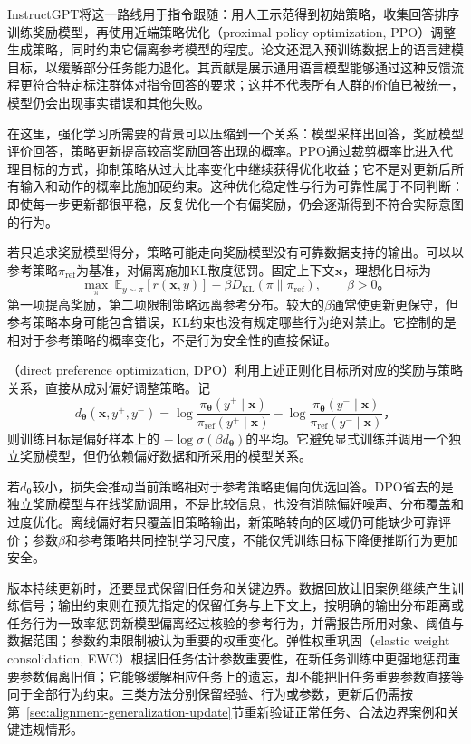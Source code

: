 InstructGPT将这一路线用于指令跟随：用人工示范得到初始策略，收集回答排序训练奖励模型，再使用近端策略优化（proximal policy optimization, PPO）调整生成策略，同时约束它偏离参考模型的程度。论文还混入预训练数据上的语言建模目标，以缓解部分任务能力退化。其贡献是展示通用语言模型能够通过这种反馈流程更符合特定标注群体对指令回答的要求；这并不代表所有人群的价值已被统一，模型仍会出现事实错误和其他失败。

在这里，强化学习所需要的背景可以压缩到一个关系：模型采样出回答，奖励模型评价回答，策略更新提高较高奖励回答出现的概率。PPO通过裁剪概率比进入代理目标的方式，抑制策略从过大比率变化中继续获得优化收益；它不是对更新后所有输入和动作的概率比施加硬约束。这种优化稳定性与行为可靠性属于不同判断：即使每一步更新都很平稳，反复优化一个有偏奖励，仍会逐渐得到不符合实际意图的行为。

若只追求奖励模型得分，策略可能走向奖励模型没有可靠数据支持的输出。可以以参考策略$\pi_{\mathrm{ref}}$为基准，对偏离施加KL散度惩罚。固定上下文$\bm{x}$，理想化目标为
\begin{equation}
 \max_\pi\
 \mathbb E_{y\sim\pi}[r(\bm{x},y)]
 -\beta D_{\mathrm{KL}}(\pi\|\pi_{\mathrm{ref}}),
 \qquad \beta>0\text{。}
 \label{eq:alignment-kl-objective}
\end{equation}
第一项提高奖励，第二项限制策略远离参考分布。较大的$\beta$通常使更新更保守，但参考策略本身可能包含错误，KL约束也没有规定哪些行为绝对禁止。它控制的是相对于参考策略的概率变化，不是行为安全性的直接保证。

（direct preference optimization, DPO）利用上述正则化目标所对应的奖励与策略关系，直接从成对偏好调整策略。记
\[
 d_{\bm{\theta}}(\bm{x},y^+,y^-)
 =\log\frac{\pi_{\bm{\theta}}(y^+\mid\bm{x})}
              {\pi_{\mathrm{ref}}(y^+\mid\bm{x})}
 -\log\frac{\pi_{\bm{\theta}}(y^-\mid\bm{x})}
              {\pi_{\mathrm{ref}}(y^-\mid\bm{x})}\text{，}
\]
则训练目标是偏好样本上的
$-\log\sigma(\beta d_{\bm{\theta}})$的平均。它避免显式训练并调用一个独立奖励模型，但仍依赖偏好数据和所采用的模型关系。

若$d_{\bm{\theta}}$较小，损失会推动当前策略相对于参考策略更偏向优选回答。DPO省去的是独立奖励模型与在线奖励调用，不是比较信息，也没有消除偏好噪声、分布覆盖和过度优化。离线偏好若只覆盖旧策略输出，新策略转向的区域仍可能缺少可靠评价；参数$\beta$和参考策略共同控制学习尺度，不能仅凭训练目标下降便推断行为更加安全。

版本持续更新时，还要显式保留旧任务和关键边界。数据回放让旧案例继续产生训练信号；输出约束则在预先指定的保留任务与上下文上，按明确的输出分布距离或任务行为一致率惩罚新模型偏离经过核验的参考行为，并需报告所用对象、阈值与数据范围；参数约束限制被认为重要的权重变化。弹性权重巩固（elastic weight consolidation, EWC）根据旧任务估计参数重要性，在新任务训练中更强地惩罚重要参数偏离旧值；它能够缓解相应任务上的遗忘，却不能把旧任务重要参数直接等同于全部行为约束。三类方法分别保留经验、行为或参数，更新后仍需按第~\ref{sec:alignment-generalization-update}节重新验证正常任务、合法边界案例和关键违规情形。

